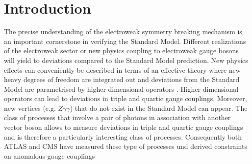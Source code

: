 \section{Introduction}
\label{sec:intro}

The precise understanding of the electroweak symmetry breaking mechanism is an important cornerstone in verifying the
Standard Model. Different realizations of the electroweak sector or new physics coupling to electroweak gauge bosons will
yield to deviations compared to the Standard Model prediction. New physics effects can conveniently be described in terms
of an effective theory where new heavy degrees of freedom are integrated out and deviations from the Standard Model are 
parametrised by higher dimensional operators \cite{Weinberg:1978kz,Weinberg:1979pi}. Higher dimensional operators can lead
 to deviations in triple and quartic gauge couplings. Moreover, new vertices (e.g. $Z\gamma\gamma$) that do not exist in the 
Standard Model can appear. The class of processes that involve a pair of photons in association with another vector boson
allows to measure deviations in triple and quartic gauge couplings and is therefore a particularly interesting class of processes.
 Consequently both ATLAS and CMS have measured these type of processes und derived constraints on anomalous gauge
 couplings \cite{Aad:2016sau,Sirunyan:2017lvq,Aad:2015uqa,Aad:2015bua}